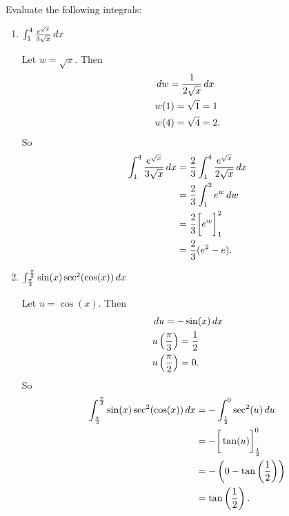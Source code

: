 \documentclass[nooutcomes]{ximera}
\begin{document}
\begin{problem}
Evaluate the following integrals:

	\begin{enumerate}
	
	\item  $\int_1^4 \frac{e^{\sqrt{x}}}{3\sqrt{x}} \,d x$
		\begin{freeResponse}
		Let $w=\sqrt{x}$.  Then
			\begin{align*}
			&\,d w = \frac{1}{2 \sqrt{x}} \,d x  \\
			&w(1) = \sqrt{1} = 1  \\
			&w(4) = \sqrt{4} = 2.
			\end{align*}
		So
			\begin{align*}
			\int_1^4 \frac{e^{\sqrt{x}}}{3\sqrt{x}} \,d x &= \frac{2}{3} \int_1^4 \frac{e^{\sqrt{x}}}{2\sqrt{x}} \,d x  \\
			&= \frac{2}{3} \int_1^2 e^w \,d w  \\
			&= \frac{2}{3} \bigg[ e^w \bigg]_1^2  \\
			&= \frac{2}{3} (e^2 - e).
			\end{align*}
		\end{freeResponse}
		
		
		
	\item  $\int_{\frac{\pi}{3}}^{\frac{\pi}{2}} \sin(x) \sec^2(\cos(x)) \,d x$
		\begin{freeResponse}
		Let $u=\cos(x)$.  Then
			\begin{align*}
			&\,d u = -\sin(x) \,d x  \\
			&u\left( \frac{\pi}{3} \right) = \frac{1}{2}  \\
			&u\left( \frac{\pi}{2} \right) = 0.
			\end{align*}
		So
			\begin{align*}
			\int_{\frac{\pi}{3}}^{\frac{\pi}{2}} \sin(x) \sec^2(\cos(x)) \,d x &= - \int_{\frac{1}{2}}^0 \sec^2(u) \,d u   \\
			&= - \bigg[ \tan(u) \bigg]_{\frac{1}{2}}^0  \\
			&=  -\left( 0 - \tan\left( \frac{1}{2} \right) \right)  \\
			&= \tan \left( \frac{1}{2} \right).
			\end{align*}
		\end{freeResponse}
		
		
		
	\end{enumerate}
			
			
	
\end{problem}
\end{document}
